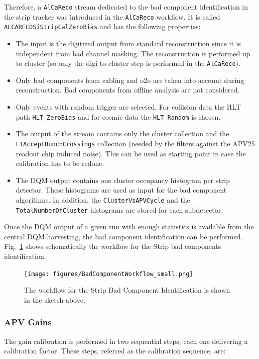 Therefore, a \texttt{AlCaReco} stream dedicated to the bad component identification in the strip tracker was introduced in the \texttt{AlCaReco} workflow. It is called \texttt{ALCARECOSiStripCalZeroBias} and has the following properties:
\begin{itemize}
\item  The input is the digitized output from standard reconstruction since it is independent from bad channel masking. The reconstruction is performed up to cluster (so only the digi to cluster step is performed in the \texttt{AlCaReco}).
\item Only bad components from cabling and o2o are taken into account during reconstruction. Bad components from offline analysis are not considered.
\item Only events with random trigger are selected. For collision data the HLT path \texttt{HLT\_ZeroBias} and for cosmic data the \texttt{HLT\_Random} is chosen.
\item The output of the stream contains only the cluster collection and the \texttt{L1AcceptBunchCrossings} collection (needed by the filters against the APV25 readout chip induced noise). This can be used as starting point in case the calibration has to be redone.
\item The DQM output contains one cluster occupancy histogram per strip detector. These histograms are used as input for the bad component algorithms. In addition, the \texttt{ClusterVsAPVCycle} and the \texttt{TotalNumberOfCluster} histograms are stored for each subdetector. 
\end{itemize}

Once the DQM output of a given run with enough statistics is available from the central DQM harvesting, the bad component identification can be performed.\\ Fig.~\ref{fig:fill10200PCL} shows schematically the workflow for the Strip bad components identification.

\begin{figure}[htbp]
   \centering
	\texttt{[image: figures/BadComponentWorkflow\_small.png]}
   \caption{The workflow for the Strip Bad Component Identification is shown in the sketch above.}
   \label{fig:fill10200PCL}
\end{figure}

\subsubsection{APV Gains}
The gain calibration is performed in two sequential steps, each one delivering a
calibration factor. These steps, referred as the calibration sequence, are:

